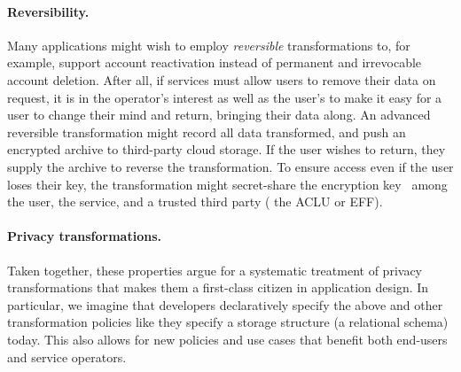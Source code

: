 \paragraph{Reversibility.}
%
Many applications might wish to employ \emph{reversible} transformations to, for example, support
account reactivation instead of permanent and irrevocable account deletion.
%
After all, if services must allow users to remove their data on request, it is in the operator's
interest as well as the user's to make it easy for a user to change their mind and return, bringing their data along.
%
An advanced reversible transformation might record all data transformed, and push an encrypted
archive to third-party cloud storage.
%
If the user wishes to return, they supply the archive to reverse the transformation.
%
To ensure access even if the user loses their key, the transformation might secret-share
the encryption key~\cite{secretsharing} among the user, the service, and a trusted third party (\eg
the ACLU or EFF).
%

\paragraph{Privacy transformations.}
%
%
Taken together, these properties argue for a systematic treatment of privacy transformations that makes them a
first-class citizen in application design.
%
In particular, we imagine that developers declaratively specify the above and other
transformation policies like they specify a storage structure (\eg a relational schema) today.
%
This also allows for new policies and use cases that benefit both end-users and service operators.
%
%
